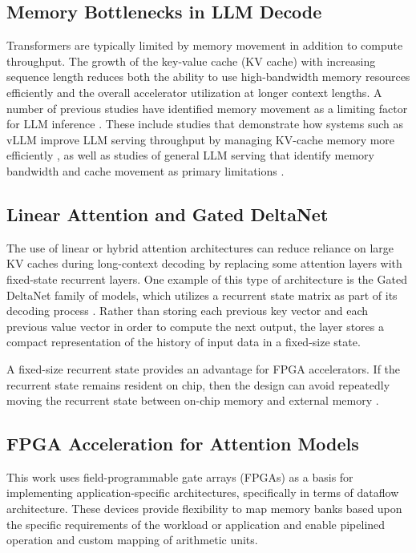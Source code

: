 ﻿\documentclass[conference]{IEEEtran}
\begin{document}
\subsection{Memory Bottlenecks in LLM Decode}
Transformers are typically limited by memory movement in addition to compute throughput. The growth of the key-value cache (KV cache) with increasing sequence length reduces both the ability to use high-bandwidth memory resources efficiently and the overall accelerator utilization at longer context lengths. A number of previous studies have identified memory movement as a limiting factor for LLM inference \cite{b1,b4,b7}. These include studies that demonstrate how systems such as vLLM improve LLM serving throughput by managing KV-cache memory more efficiently \cite{b4}, as well as studies of general LLM serving that identify memory bandwidth and cache movement as primary limitations \cite{b1,b7}.

\subsection{Linear Attention and Gated DeltaNet}
The use of linear or hybrid attention architectures can reduce reliance on large KV caches during long-context decoding by replacing some attention layers with fixed-state recurrent layers. One example of this type of architecture is the Gated DeltaNet family of models, which utilizes a recurrent state matrix as part of its decoding process \cite{b3}. Rather than storing each previous key vector and each previous value vector in order to compute the next output, the layer stores a compact representation of the history of input data in a fixed-size state.

A fixed-size recurrent state provides an advantage for FPGA accelerators. If the recurrent state remains resident on chip, then the design can avoid repeatedly moving the recurrent state between on-chip memory and external memory \cite{b10}.

\subsection{FPGA Acceleration for Attention Models}
This work uses field-programmable gate arrays (FPGAs) as a basis for implementing application-specific architectures, specifically in terms of dataflow architecture. These devices provide flexibility to map memory banks based upon the specific requirements of the workload or application and enable pipelined operation and custom mapping of arithmetic units.
\end{document}
